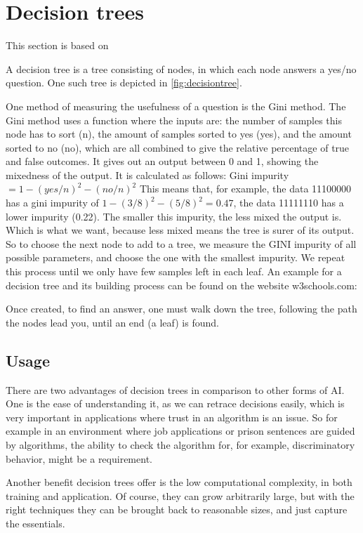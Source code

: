 \section{Decision trees}
\label{sec:decisionTrees}
This section is based on \cite[p. 697f]{MA}

A decision tree is a tree consisting of nodes, in which each node answers a yes/no question. One such tree is depicted in \autoref{fig:decisiontree}.

One method of measuring the usefulness of a question is the Gini method.
The Gini method uses a function where the inputs are: the number of samples this node has to sort (n), the amount of samples sorted to yes (yes), and the amount sorted to no (no), which are all combined to give the relative percentage of true and false outcomes. It gives out an output between 0 and 1, showing the mixedness of the output.
It is calculated as follows: Gini impurity $= 1-(yes/n)^2-(no/n)^2$ 
This means that, for example, the data 11100000 has a gini impurity of $1-(3/8)^2-(5/8)^2=0.47$, the data 11111110 has a lower impurity (0.22).
The smaller this impurity, the less mixed the output is. Which is what we want, because less mixed means the tree is surer of its output. 
So to choose the next node to add to a tree, we measure the GINI impurity of all possible parameters, and choose the one with the smallest impurity. We repeat this process until we only have few samples left in each leaf. 
An example for a decision tree and its building process can be found on the website w3schools.com:
\cite{decisiontree}

Once created, to find an answer, one must walk down the tree, following the path the nodes lead you, until an end (a leaf) is found.

\subsection{Usage}
There are two advantages of decision trees in comparison to other forms of AI. One is the ease of understanding it, as we can retrace decisions easily, which is very important in applications where trust in an algorithm is an issue. So for example in an environment where job applications or prison sentences are guided by algorithms, the ability to check the algorithm for, for example, discriminatory behavior, might be a requirement.

Another benefit decision trees offer is the low computational complexity, in both training and application. Of course, they can grow arbitrarily large, but with the right techniques they can be brought back to reasonable sizes, and just capture the essentials.

